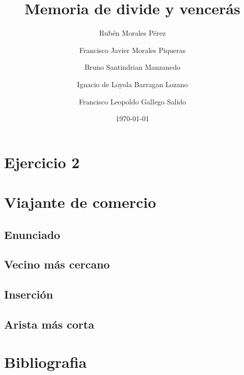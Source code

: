 \documentclass[11pt,spanish]{article} %
\title{Memoria de divide y vencerás}
\author{Rubén Morales Pérez
		\and Francisco Javier Morales Piqueras
		\and Bruno Santindrian Manzanedo
		\and Ignacio de Loyola Barragan Lozano
		\and Francisco Leopoldo Gallego Salido}
\date{\today}
\begin{document}
\maketitle
\tableofcontents %
\newpage
\setlength\parindent{0pt} %

\section{Ejercicio 2}

\newpage


\section{Viajante de comercio}
\subsection{Enunciado}
%

\subsection{Vecino más cercano}

\subsection{Inserción}

\subsection{Arista más corta}
%

\section{Bibliografia}

\newpage
\end{document}
